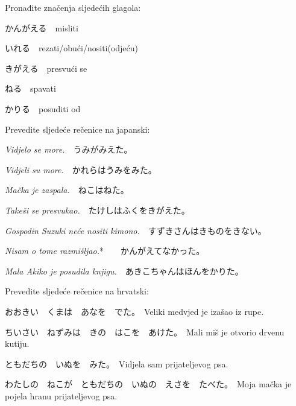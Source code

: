 
\author{Katja Kržišsnik}

	
	\begin{mondai}{Pronađite značenja sljedećih glagola:}
		\item かんがえる　misliti
		\item いれる　rezati/obući/nositi(odjeću)
		\item きがえる　presvući se
		\item ねる　spavati
		\item かりる　posuditi od
	\end{mondai}
	
	\begin{mondai}{Prevedite sljedeće rečenice na japanski:}
		\item \textit{Vidjelo se more.}　うみがみえた。
		\item \textit{Vidjeli su more.}　かれらはうみをみた。
		\item \textit{Mačka je zaspala.}　ねこはねた。
		\item \textit{Takeši se presvukao.}　たけしはふくをきがえた。
		\item \textit{Gospodin Suzuki neće nositi kimono.}　すずきさんはきものをきない。
		\item \textit{Nisam o tome razmišljao.}*　　かんがえてなかった。
		\item \textit{Mala Akiko je posudila knjigu.}　あきこちゃんはほんをかりた。
	\end{mondai}
	
	\begin{mondai}{Prevedite sljedeće rečenice na hrvatski:}
		\item おおきい　くまは　あなを　でた。　Veliki medvjed je izašao iz rupe.
		\item ちいさい　ねずみは　きの　はこを　あけた。　Mali miš je otvorio drvenu kutiju. 
		\item ともだちの　いぬを　みた。　Vidjela sam prijateljevog psa.
		\item わたしの　ねこが　ともだちの　いぬの　えさを　たべた。　\newline Moja mačka je pojela hranu prijateljevog psa.
	\end{mondai}
	
